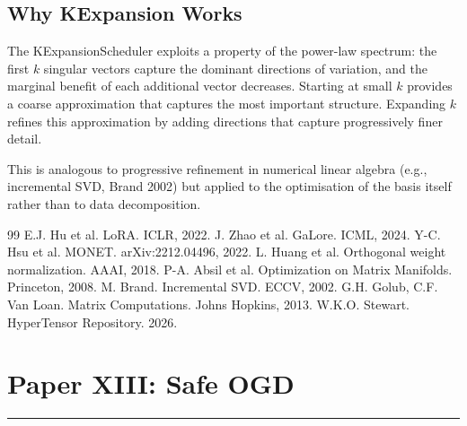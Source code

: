 \documentclass[11pt]{article}
\begin{document}
\subsection{Why KExpansion Works}

The KExpansionScheduler exploits a property of the power-law spectrum: the first $k$ singular vectors capture the dominant directions of variation, and the marginal benefit of each additional vector decreases. Starting at small $k$ provides a coarse approximation that captures the most important structure. Expanding $k$ refines this approximation by adding directions that capture progressively finer detail.

This is analogous to progressive refinement in numerical linear algebra (e.g., incremental SVD, Brand 2002) but applied to the optimisation of the basis itself rather than to data decomposition.

\clearpage
\begin{thebibliography}{99}
 E.J. Hu et al. LoRA. ICLR, 2022.
 J. Zhao et al. GaLore. ICML, 2024.
 Y-C. Hsu et al. MONET. arXiv:2212.04496, 2022.
 L. Huang et al. Orthogonal weight normalization. AAAI, 2018.
 P-A. Absil et al. Optimization on Matrix Manifolds. Princeton, 2008.
 M. Brand. Incremental SVD. ECCV, 2002.
 G.H. Golub, C.F. Van Loan. Matrix Computations. Johns Hopkins, 2013.
 W.K.O. Stewart. HyperTensor Repository. 2026.
\end{thebibliography}

\newpage



\newpage
\section{Paper XIII: Safe OGD}
\vspace{6pt}
\hrule
\vspace{12pt}
\end{document}
